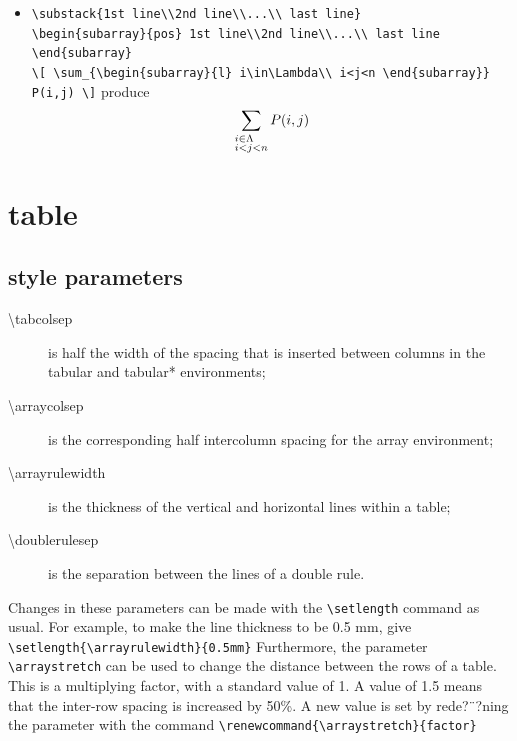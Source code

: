 \documentclass[a4paper,12pt,twoside]{book}
\begin{document}
\begin{CJK*}{UTF8}{song}
\begin{itemize}
			\item
			\verb=\substack{1st line\\2nd line\\...\\ last line}= \\
			\verb=\begin{subarray}{pos} 1st line\\2nd line\\...\\ last line \end{subarray}= \\
			\verb=\[ \sum_{\begin{subarray}{l} i\in\Lambda\\ i<j<n \end{subarray}} P(i,j) \]= produce
			\[ \sum_{\begin{subarray}{l}i\in\Lambda\\ i<j<n\end{subarray}} P(i,j) \]
			\end{itemize}
\section{table}
	\subsection{style parameters}
			\begin{description}	
			\item [\textbackslash{}tabcolsep] is half the width of the spacing that is inserted between columns in the tabular and tabular* environments;
			\item [\textbackslash{}arraycolsep] is the corresponding half intercolumn spacing for the array environment;
			\item [\textbackslash{}arrayrulewidth] is the thickness of the vertical and horizontal lines within a table;
			\item [\textbackslash{}doublerulesep] is the separation between the lines of a double rule.
			\end{description}
	
			Changes in these parameters can be made with the \verb=\setlength= command as usual. For example, to make the line thickness to be 0.5 mm, give \verb=\setlength{\arrayrulewidth}{0.5mm}= Furthermore, the parameter \verb=\arraystretch= can be used to change the distance between the rows of a table. This is a multiplying factor, with a standard value of 1. A value of 1.5 means that the inter-row spacing is increased by 50\%. A new value is set by rede?¨?ning the parameter with the command \linebreak[4] \verb=\renewcommand{\arraystretch}{factor}= \par

\end{CJK*}
\end{document}
